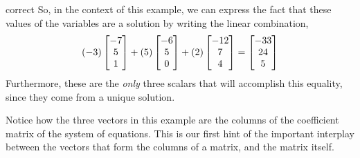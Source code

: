 \documentclass{ximera}
\begin{document}
\begin{example}
\begin{question}
    \begin{feedback}{correct}
      So, in the context of this example, we can express the fact that
      these values of the variables are a solution by writing the
      linear combination,
      \[
        (-3)\begin{bmatrix}-7\\5\\1\end{bmatrix}+
        (5)\begin{bmatrix}-6\\5\\0\end{bmatrix}+
        (2)\begin{bmatrix}-12\\7\\4\end{bmatrix}
        =
        \begin{bmatrix}-33\\24\\5\end{bmatrix}
      \]
      Furthermore, these are the \textit{only} three scalars that will
      accomplish this equality, since they come from a unique
      solution.

      Notice how the three vectors in this example are the columns of
      the coefficient matrix of the system of equations.  This is our
      first hint of the important interplay between the vectors that
      form the columns of a matrix, and the matrix itself.
    \end{feedback}
  \end{question}

\end{example}
\end{document}
